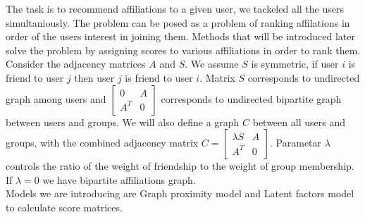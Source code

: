 \documentclass[twoside,twocolumn]{article}
\begin{document}
The task is to recommend affiliations to a given user, we tackeled all the users simultaniously. The problem can be posed as a problem of ranking affilations in order of the users interest in joining them. Methods that will be introduced later solve the problem by assigning scores to various affiliations in order to rank them. \\

Consider the adjacency matrices $A$ and $S$. We assume $S$ is symmetric, if user $i$ is friend to user $j$ then user $j$ is friend to user $i$. Matrix $S$ corresponds to undirected graph among users and $\begin{bmatrix} 	0 & A\\ 	A^T & 0 \end{bmatrix}$ corresponds to undirected bipartite graph between users and groups. We will also define a graph $C$ between all users and groups, with the combined adjacency matrix  $ C= \begin{bmatrix} 	\lambda S & A\\ 	A^T & 0 \end{bmatrix}$. Parametar $\lambda$ controls the ratio of the weight of friendship to the weight of group membership. If $\lambda = 0$ we have bipartite affiliations graph. \\

Models we are introducing are Graph proximity model and Latent factors model to calculate score matrices. 
\end{document}
